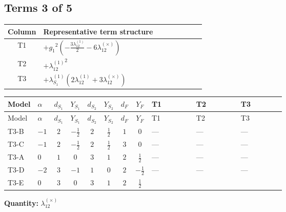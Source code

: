 \documentclass[8pt]{article}
\begin{document}
\begin{landscape}
\subsection*{Terms 3 of 5}
\begin{center}
\begin{tabular}{@{}c >{\raggedright\arraybackslash}p{0.82\linewidth}@{}}
\toprule
Column & Representative term structure \\
\midrule
T1 & \(\displaystyle +{g_1}^2 \left(-\frac{3 {\lambda_{12}^{(1)}}}{2}-6 {\lambda_{12}^{(\times)}}\right)\) \\
\midrule
T2 & \(\displaystyle +{\lambda_{12}^{(1)}}^2\) \\
\midrule
T3 & \(\displaystyle +{\lambda_{S_1}^{(1)}} (2 {\lambda_{12}^{(1)}}+3 {\lambda_{12}^{(\times)}})\) \\
\midrule
\bottomrule
\end{tabular}
\end{center}
\smallskip
\tiny
\begin{longtable}{@{}llcccccc >{\raggedright\arraybackslash}p{0.21\linewidth} >{\raggedright\arraybackslash}p{0.21\linewidth} >{\raggedright\arraybackslash}p{0.21\linewidth}@{}}
\toprule
Model & $\alpha$ & $d_{S_1}$ & $Y_{S_1}$ & $d_{S_2}$ & $Y_{S_2}$ & $d_F$ & $Y_F$ & T1 & T2 & T3 \\
\midrule
\endfirsthead
\toprule
Model & $\alpha$ & $d_{S_1}$ & $Y_{S_1}$ & $d_{S_2}$ & $Y_{S_2}$ & $d_F$ & $Y_F$ & T1 & T2 & T3 \\
\midrule
\endhead
T3-B & $-1$ & $2$ & $-\frac{1}{2}$ & $2$ & $\frac{1}{2}$ & $1$ & $0$ & --- & --- & --- \\
\midrule
T3-C & $-1$ & $2$ & $-\frac{1}{2}$ & $2$ & $\frac{1}{2}$ & $3$ & $0$ & --- & --- & --- \\
\midrule
T3-A & $0$ & $1$ & $0$ & $3$ & $1$ & $2$ & $\frac{1}{2}$ & --- & --- & --- \\
\midrule
T3-D & $-2$ & $3$ & $-1$ & $1$ & $0$ & $2$ & $-\frac{1}{2}$ & --- & --- & --- \\
\midrule
T3-E & $0$ & $3$ & $0$ & $3$ & $1$ & $2$ & $\frac{1}{2}$ & \scriptsize\adjustbox{max width=\linewidth}{$\begin{gathered} +{g_1}^2 \left(-\frac{3 {\lambda_{12}^{(1)}}}{2}-6 {\lambda_{12}^{(\times)}}\right)\end{gathered}$} & \scriptsize\adjustbox{max width=\linewidth}{$\begin{gathered} +{\lambda_{12}^{(1)}}^2\end{gathered}$} & \scriptsize\adjustbox{max width=\linewidth}{$\begin{gathered} +{\lambda_{S_1}^{(1)}} (2 {\lambda_{12}^{(1)}}+3 {\lambda_{12}^{(\times)}})\end{gathered}$} \\
\midrule
\bottomrule
\end{longtable}
\clearpage
\noindent\textbf{Quantity: }$\lambda_{12}^{(\times)}$\par\smallskip

\end{landscape}
\end{document}
